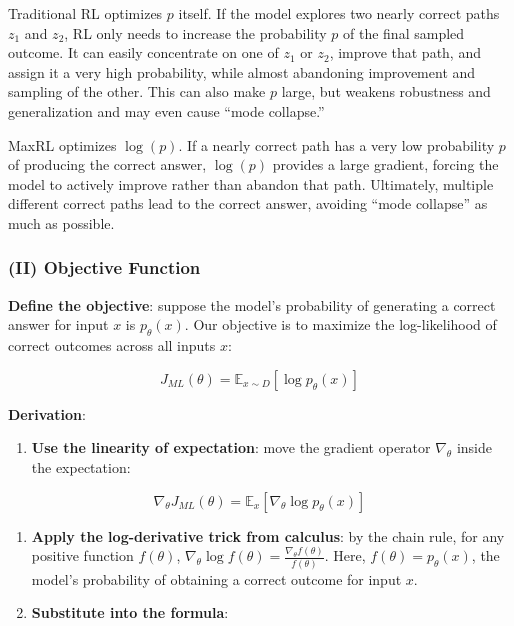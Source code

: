 Traditional RL optimizes \(p\) itself. If the model explores two nearly correct paths \(z_1\) and \(z_2\), RL only needs to increase the probability \(p\) of the final sampled outcome. It can easily concentrate on one of \(z_1\) or \(z_2\), improve that path, and assign it a very high probability, while almost abandoning improvement and sampling of the other. This can also make \(p\) large, but weakens robustness and generalization and may even cause ``mode collapse.''

MaxRL optimizes \(\log(p)\). If a nearly correct path has a very low probability \(p\) of producing the correct answer, \(\log(p)\) provides a large gradient, forcing the model to actively improve rather than abandon that path. Ultimately, multiple different correct paths lead to the correct answer, avoiding ``mode collapse'' as much as possible.

\hypertarget{ii-objective-function}{%
\subsubsection{(II) Objective Function}\label{ii-objective-function}}

\textbf{Define the objective}: suppose the model's probability of generating a correct answer for input \(x\) is \(p_\theta(x)\). Our objective is to maximize the log-likelihood of correct outcomes across all inputs \(x\):

\[
J_{ML}(\theta)=\mathbb{E}_{x\sim D}[\log p_\theta(x)]
\]

\textbf{Derivation}:

\begin{enumerate}
\def\labelenumi{\arabic{enumi}.}
\tightlist
\item
{}
  \textbf{Use the linearity of expectation}: move the gradient operator \(\nabla_\theta\) inside the expectation:
\end{enumerate}

\[
\nabla_\theta J_{ML}(\theta)=\mathbb{E}_x[\nabla_\theta \log p_\theta(x)]
\]

\begin{enumerate}
\def\labelenumi{\arabic{enumi}.}
\setcounter{enumi}{1}
\item
  \textbf{Apply the log-derivative trick from calculus}: by the chain rule, for any positive function \(f(\theta)\), \(\nabla_\theta \log f(\theta)=\frac{\nabla_\theta f(\theta)}{f(\theta)}\). Here, \(f(\theta)=p_\theta(x)\), the model's probability of obtaining a correct outcome for input \(x\).
\item
{}
  \textbf{Substitute into the formula}:
\end{enumerate}


